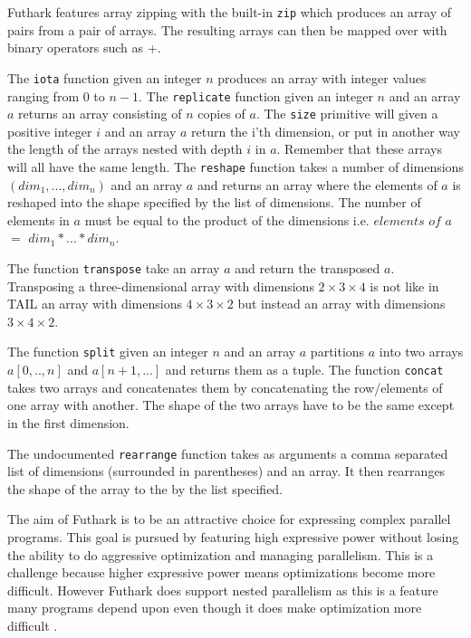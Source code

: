 \documentclass[11pt]{article}
\begin{document}
Futhark features array zipping with the built-in {\tt zip} which produces an array of pairs from a pair of arrays.
The resulting arrays can then be mapped over with binary operators such as +.

The {\tt iota} function given an integer $n$ produces an array with integer values ranging from 0 to $n-1$.
The {\tt replicate} function given an integer $n$ and an array $a$ returns an array consisting of $n$ copies of $a$.
The {\tt size} primitive will given a positive integer $i$ and an array $a$ return the i'th dimension, or put in another way
the length of the arrays nested with depth $i$ in $a$. Remember that these arrays will all have the same length.
The {\tt reshape} function takes a number of dimensions $(dim_1,..., dim_n)$ and an array $a$ and returns an array where the elements of $a$ is reshaped into the shape specified by the list of dimensions.
The number of elements in $a$ must be equal to the product of the dimensions i.e. $elements$ $of$ $a$ $=$ $dim_1 * ... * dim_n$.

The function {\tt transpose} take an array $a$ and return the transposed $a$.
Transposing a three-dimensional array with dimensions $2 \times 3 \times 4$ is not like in TAIL an array with dimensions $4\times3\times2$ but instead an array with dimensions $3\times4\times2$.

The function {\tt split} given an integer $n$ and an array $a$ partitions $a$ into two arrays $a[0,..,n]$ and $a[n+1,...]$ and returns them as a tuple. 
The function {\tt concat} takes two arrays and concatenates them by concatenating the row/elements of one array with another. The shape of the two arrays have to be the same except in the first dimension. 

The undocumented {\tt rearrange} function takes as arguments a comma separated list of dimensions (surrounded in parentheses) and an array. It then rearranges the shape of the array to the by the list specified.

The aim of Futhark is to be an attractive choice for expressing complex parallel programs.
This goal is pursued by featuring high expressive power without
losing the ability to do aggressive optimization and managing parallelism.
This is a challenge because higher expressive power means optimizations become more difficult. 
However Futhark does support nested parallelism as this is a feature many programs 
depend upon even though it does make optimization more difficult \cite{TroelsHenriksen}.

\end{document}
